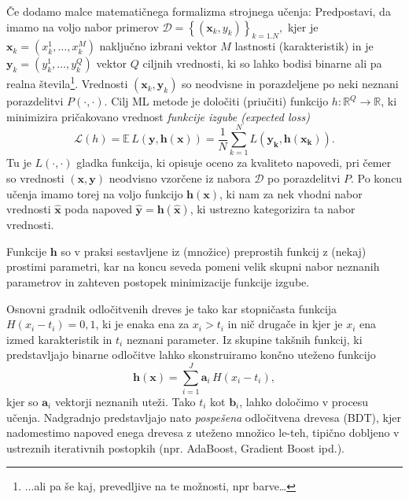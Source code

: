 \documentclass[slovene,11pt,a4paper]{article}
\begin{document}
Če dodamo malce matematičnega formalizma strojnega učenja: Predpostavi, da imamo na voljo nabor primerov 
\(\mathcal{D}=\left\{\left(\mathbf{x}_{k}, y_{k}\right)\right\}_{k=1 . N},\) kjer je
\(\mathbf{x}_{k}=\left(x_{k}^{1}, \ldots, x_{k}^{M}\right)\) naključno izbrani vektor
 \(M\) lastnosti (karakteristik) in je \(\mathbf{y}_{k} = \left(y_{k}^{1}, \ldots, y_{k}^{Q}\right)\)
 vektor $Q$ ciljnih vrednosti, ki so lahko bodisi binarne ali pa realna 
 števila\footnote{...ali pa še kaj, prevedljive na te možnosti, npr barve\ldots}. 
 Vrednosti \(\left(\mathbf{x}_{k}, \mathbf{y}_{k}\right)\) so neodvisne in porazdeljene po neki
 neznani porazdelitvi \(P(\cdot, \cdot) .\) Cilj ML metode je določiti (priučiti) funkcijo
 \(h: \mathbb{R}^{Q} \rightarrow \mathbb{R}\), ki minimizira pričakovano vrednost \emph{funkcije
 izgube (expected loss)} \[\mathcal{L}(h)=\mathbb{E}\, L(\mathbf{y}, \mathbf{h}(\mathbf{x})) = \frac{1}{N}\sum\limits_{k=1}^{N} L(\mathbf{y_k}, \mathbf{h}(\mathbf{x_k}))  .\] 
 Tu je \(L(\cdot, \cdot)\)  gladka funkcija, ki opisuje oceno za kvaliteto napovedi, 
 pri čemer so  vrednosti \((\mathbf{x}, \mathbf{y})\)
 neodvisno  vzorčene iz nabora \(\mathcal{D}\) po porazdelitvi \(P\). Po koncu učenja
 imamo torej na voljo funkcijo $\mathbf{h}(\mathbf{x})$, ki nam za nek vhodni nabor vrednosti
 $\mathbf{\hat{x}}$ poda napoved $\mathbf{\hat{y}}=\mathbf{h}(\mathbf{\hat{x}})$, ki ustrezno kategorizira
 ta nabor vrednosti. 
 
 Funkcije $\mathbf{h}$ so v praksi sestavljene iz (množice) preprostih funkcij z (nekaj) prostimi
 parametri, kar na koncu seveda pomeni velik skupni nabor neznanih parametrov in zahteven
 postopek minimizacije funkcije izgube. 
 
 Osnovni gradnik odločitvenih dreves je tako kar stopničasta funkcija $H(x_i-t_i)={0,1}$, ki je enaka
 ena za $x_i > t_i$ in nič drugače in kjer je $x_i$ ena izmed karakteristik in $t_i$ neznani parameter.
Iz skupine takšnih funkcij, ki predstavljajo binarne odločitve lahko skonstruiramo končno uteženo 
funkcijo \[\mathbf{h}(\mathbf{x})=\sum\limits_{i=1}^{J} \mathbf{a}_{i}\, H(x_i-t_i),\] kjer so $\mathbf{a}_i$ vektorji neznanih uteži. 
Tako $t_i$ kot $\mathbf{b}_i$, lahko določimo v procesu učenja. Nadgradnjo predstavljajo nato \emph{pospešena} odločitvena
drevesa (BDT), kjer nadomestimo napoved enega drevesa z uteženo množico le-teh, tipično dobljeno
v ustreznih iterativnih postopkih (npr. AdaBoost, Gradient Boost ipd.).
\end{document}
